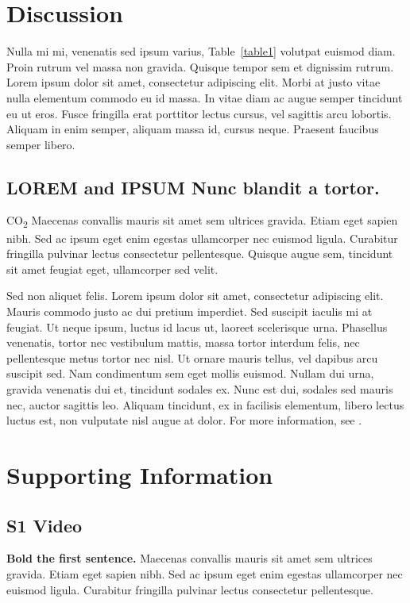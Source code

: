 \section*{Discussion}
Nulla mi mi, venenatis sed ipsum varius, Table~\ref{table1} volutpat euismod diam. Proin rutrum vel massa non gravida. Quisque tempor sem et dignissim rutrum. Lorem ipsum dolor sit amet, consectetur adipiscing elit. Morbi at justo vitae nulla elementum commodo eu id massa. In vitae diam ac augue semper tincidunt eu ut eros. Fusce fringilla erat porttitor lectus cursus, vel sagittis arcu lobortis. Aliquam in enim semper, aliquam massa id, cursus neque. Praesent faucibus semper libero.

\subsection*{{\bf LOREM} and {\bf IPSUM} Nunc blandit a tortor.}

CO\textsubscript{2} Maecenas convallis mauris sit amet sem ultrices gravida. Etiam eget sapien nibh. Sed ac ipsum eget enim egestas ullamcorper nec euismod ligula. Curabitur fringilla pulvinar lectus consectetur pellentesque. Quisque augue sem, tincidunt sit amet feugiat eget, ullamcorper sed velit. 

Sed non aliquet felis. Lorem ipsum dolor sit amet, consectetur adipiscing elit. Mauris commodo justo ac dui pretium imperdiet. Sed suscipit iaculis mi at feugiat. Ut neque ipsum, luctus id lacus ut, laoreet scelerisque urna. Phasellus venenatis, tortor nec vestibulum mattis, massa tortor interdum felis, nec pellentesque metus tortor nec nisl. Ut ornare mauris tellus, vel dapibus arcu suscipit sed. Nam condimentum sem eget mollis euismod. Nullam dui urna, gravida venenatis dui et, tincidunt sodales ex. Nunc est dui, sodales sed mauris nec, auctor sagittis leo. Aliquam tincidunt, ex in facilisis elementum, libero lectus luctus est, non vulputate nisl augue at dolor. For more information, see .

\section*{Supporting Information}

\subsection*{S1 Video}
\label{S1_Video}
{\bf Bold the first sentence.}  Maecenas convallis mauris sit amet sem ultrices gravida. Etiam eget sapien nibh. Sed ac ipsum eget enim egestas ullamcorper nec euismod ligula. Curabitur fringilla pulvinar lectus consectetur pellentesque.

